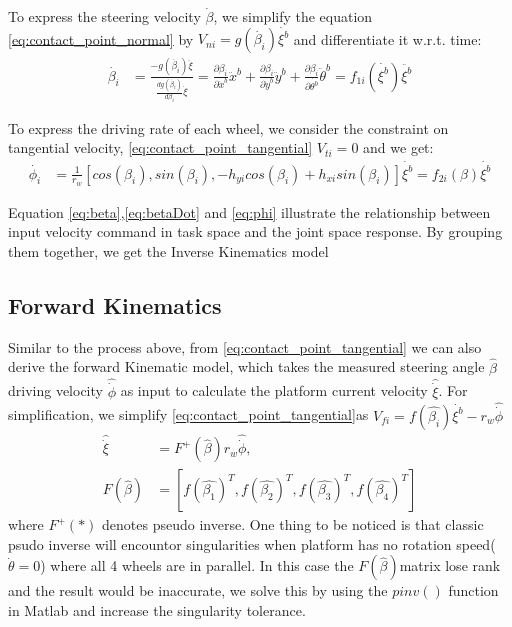 To express the steering velocity $\dot{\beta}$, we simplify the equation \cref{eq:contact_point_normal} by $V_{ni}=g(\dot{\beta_i})\dot{\xi^b}$ and differentiate it w.r.t. time:
\begin{equation}\label{eq:betaDot}
	\begin{split}
	\dot{\beta_i} &= \frac{-g(\dot{\beta_i})\ddot{\xi}}{\frac{dg(\dot{\beta_i})}{d\beta_i}\dot{\xi}}=\frac{\partial\beta_i}{\partial\dot{x}^b}\ddot{x}^b+\frac{\partial\beta_i}{\partial\dot{y}^b}\ddot{y}^b +\frac{\partial\beta_i}{\partial\dot{\theta^b}}\ddot{\theta}^b
	=f_{1i}(\dot{\xi^b})\ddot{\xi^b}
	\end{split}
\end{equation}

To express the driving rate of each wheel, we consider the constraint on tangential velocity, \cref{eq:contact_point_tangential} $V_{ti}=0 $ and we get:
\begin{equation}\label{eq:phi}
	\begin{split}
	\dot{\phi_i} &= \frac{1}{r_w}[cos(\beta_i), sin(\beta_i), -h_{yi}cos(\beta_i)+h_{xi}sin(\beta_i)]\dot{\xi^b}=f_{2i}(\beta)\dot{\xi^b}
	\end{split}
\end{equation}

Equation \cref{eq:beta},\cref{eq:betaDot} and \cref{eq:phi} illustrate the relationship between input velocity command in task space and the joint space response. By grouping them together, we get the Inverse Kinematics model


\subsection{Forward Kinematics}
\label{sec:forwardKinematics}

Similar to the process above, from \cref{eq:contact_point_tangential} we can also derive the forward Kinematic model, which takes the measured steering angle $\hat{\beta}$ driving velocity $\hat{\dot{\phi}}$ as input to 
calculate the platform current velocity $\hat{\dot{\xi}}$. For simplification, we simplify \cref{eq:contact_point_tangential}as $V_{fi}=f(\hat{\beta_i})\dot{\xi^b} -r_w\hat{\dot{\phi}}$
\begin{equation}
	\label{eq:forwardKinematics}
	\begin{split}
	\hat{\dot{\xi}} &= F^+(\hat{\beta})r_w\hat{\dot{\phi}},\\
	F(\hat{\beta}) &= [f(\hat{\beta_1})^T, f(\hat{\beta_2})^T, f(\hat{\beta_3})^T, f(\hat{\beta_4})^T]
	\end{split}
	\end{equation}
where $F^+(*)$ denotes pseudo inverse. One thing to be noticed is that classic psudo inverse will encountor singularities when platform has no rotation speed($\dot{\theta}=0$) where all 4 wheels are in parallel. In this case the $F(\hat{\beta})$matrix lose rank and the result would be inaccurate, we solve this by using the $pinv()$ function in Matlab and increase the singularity tolerance.


